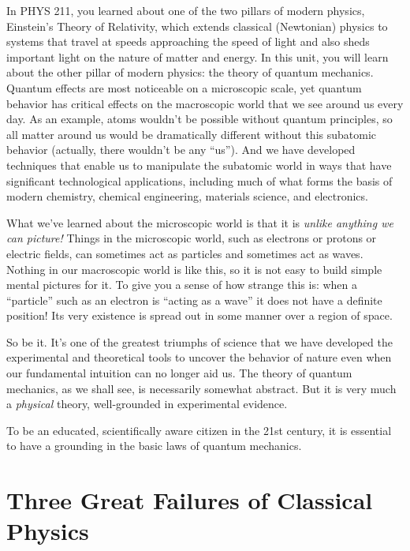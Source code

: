 In PHYS 211, you learned about one of the two pillars of modern physics,
Einstein's Theory of Relativity, which extends classical (Newtonian)
physics to systems that travel at speeds approaching the speed of light
and also sheds important light on the nature of matter and energy.
In this unit, you will learn about the other pillar of modern physics:
the theory of quantum mechanics.  Quantum effects are most noticeable on
a microscopic scale, yet quantum behavior has critical effects on
the macroscopic world that we see around us every day. As an example,
atoms wouldn't be possible without quantum principles, so all matter
around us would be dramatically different without this subatomic
behavior (actually, there wouldn't be any ``us'').  And we have developed
techniques that enable us to manipulate the subatomic world in ways that
have significant technological applications, including much of what forms
the basis of modern chemistry, chemical engineering, materials science,
and electronics.

What we've learned about the microscopic world is that it is {\it
  unlike anything we can picture!}  Things in the microscopic world,
such as electrons or protons or electric fields, can sometimes act as
particles and sometimes act as waves.  
Nothing in our macroscopic world is like this, so it is not easy
to build simple mental pictures for it.  To give you a sense of how
strange this is: when a ``particle'' such as an electron is ``acting
as a wave'' it does not have a definite position!  Its very existence
is spread out in some manner over a region of space.

So be it.  It's one of the greatest triumphs of science that we have
developed the experimental and theoretical tools to uncover the
behavior of nature even when our fundamental intuition can no longer
aid us.  The theory of quantum mechanics, as we shall see, is
necessarily somewhat abstract.  But it is very much a {\it physical}
theory, well-grounded in experimental evidence.


To be an educated,
scientifically aware citizen in the 21st century, it is essential to
have a grounding in the basic laws of quantum mechanics.

\section{Three Great Failures of Classical Physics}
\label{sec:three_great_failures}

